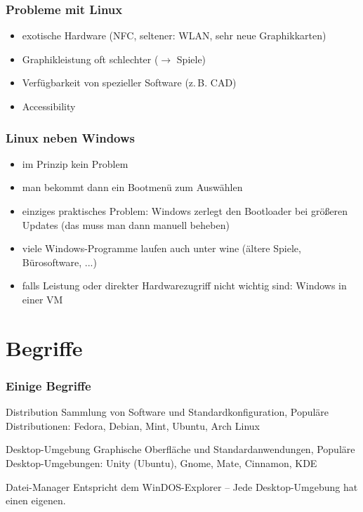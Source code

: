 \documentclass[t]{beamer}
\begin{document}
\begin{frame}
  \frametitle{Probleme mit Linux}
  \begin{itemize}
  \item exotische Hardware (NFC, seltener: WLAN, sehr neue Graphikkarten)
  \item Graphikleistung oft schlechter ($\rightarrow$ Spiele)
  \item Verfügbarkeit von spezieller Software (z.\,B. CAD)
  \item Accessibility
  \end{itemize}
\end{frame}

\begin{frame}
  \frametitle{Linux neben Windows}
  \begin{itemize}
  \item im Prinzip kein Problem
  \item man bekommt dann ein Bootmenü zum Auswählen
  \item einziges praktisches Problem: Windows zerlegt den Bootloader
    bei größeren Updates (das muss man dann manuell beheben)
  \item viele Windows-Programme laufen auch unter wine (ältere Spiele,
    Bürosoftware, ...)
  \item falls Leistung oder direkter Hardwarezugriff nicht wichtig
    sind: Windows in einer VM
  \end{itemize}
\end{frame}

\section{Begriffe}
\begin{frame}
  \frametitle{Einige Begriffe}
  \begin{block}{Distribution}
    Sammlung von Software und Standardkonfiguration, Populäre
    Distributionen: Fedora, Debian, Mint, Ubuntu, Arch Linux
  \end{block}
  \begin{block}{Desktop-Umgebung}
    Graphische Oberfläche und Standardanwendungen, Populäre
    Desktop-Umgebungen: Unity (Ubuntu), Gnome, Mate, Cinnamon, KDE
  \end{block}
  \begin{block}{Datei-Manager}
    Entspricht dem WinDOS-Explorer – Jede Desktop-Umgebung hat einen
    eigenen.
  \end{block}
\end{frame}
\end{document}
